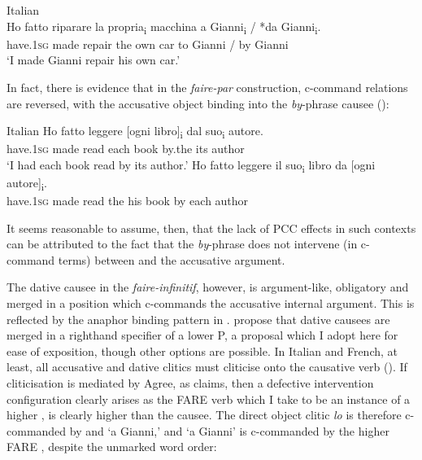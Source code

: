 \documentclass[output=paper,colorlinks,citecolor=brown,nonflat]{langsci/langscibook}
\begin{document}
\ea%
    \label{ex:sheehan:20}
    Italian \citep{Burzio1986}\\
    \gll    Ho   fatto   riparare   la   propria\textsubscript{i} macchina  a  Gianni\textsubscript{i} / *da   Gianni\textsubscript{i}.\\
            have.\textsc{1sg}   made   repair   the  own   car   to   Gianni /  by   Gianni\\
    \glt    ‘I made Gianni repair his own car.’
\z

In fact, there is evidence that in the \textit{faire-par} construction, c-command relations are reversed, with the accusative object binding into the \textit{by}-phrase causee (\citealt{SheehanCyrino2016}):

\ea%
    \label{ex:sheehan:21}
    Italian \citep[286]{SheehanCyrino2016}
    \ea\label{ex:sheehan:21a}
    \gll    Ho   fatto   leggere [ogni   libro]\textsubscript{i} dal   suo\textsubscript{i}   autore.\\
            have.\textsc{1sg}   made   read   {\db}each book   by.the   its   author\\
    \glt    ‘I had each book read by its author.’
    \ex\label{ex:sheehan:21b}
    \gll    *Ho   fatto   leggere   il  suo\textsubscript{i} libro   da   [ogni  autore]\textsubscript{i}.\\
            have.\textsc{1sg}   made   read   the  his   book   by   {\db}each   author\\
    \z
\z

It seems reasonable to assume, then, that the lack of PCC effects in such contexts can be attributed to the fact that the \textit{by}-phrase does not intervene (in c-command terms) between {\liv} and the accusative argument.

The dative causee in the \textit{faire-infinitif}, however, is argument-like, obligatory and merged in a position which c-commands the accusative internal argument. This is reflected by the anaphor binding pattern in . \citet{FolliHarley2007} propose that dative causees are merged in a righthand specifier of a lower {\liv}P, a proposal which I adopt here for ease of exposition, though other options are possible. In Italian and French, at least, all accusative and dative clitics must cliticise onto the causative verb (\citealt{Kayne1975, Burzio1986, Guasti1993}). If cliticisation is mediated by Agree, as \citet{Preminger2019} claims, then a defective intervention configuration clearly arises as the FARE verb which I take to be an instance of a higher {\liv}, is clearly higher than the causee. The direct object clitic \textit{lo} is therefore c-commanded by {\liv} and ‘a Gianni,’ and ‘a Gianni’ is c-commanded by the higher FARE {\liv}, despite the unmarked word order:
\end{document}
